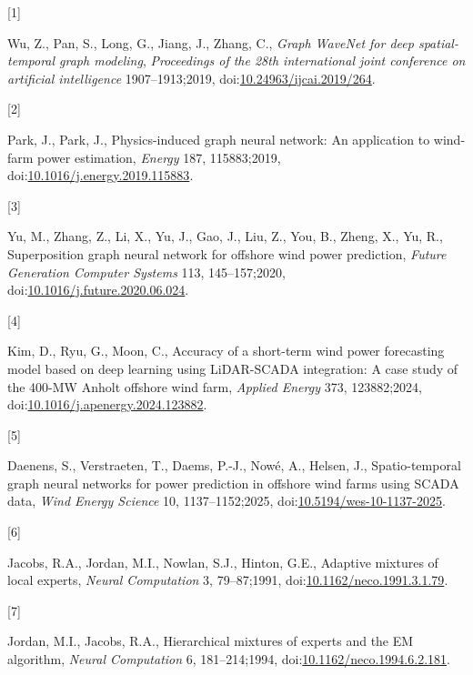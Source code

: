 \documentclass[
  11pt]{article}
\newlength{\cslhangindent}
\newlength{\csllabelwidth}
\newenvironment{CSLReferences}[2] %
 {\begin{list}{}{%
  \setlength{\itemindent}{0pt}
  \setlength{\leftmargin}{0pt}
  \setlength{\parsep}{0pt}
  \ifodd #1
   \setlength{\leftmargin}{\cslhangindent}
   \setlength{\itemindent}{-1\cslhangindent}
  \fi
  \setlength{\itemsep}{#2\baselineskip}}}
 {\end{list}}
\newcommand{\CSLLeftMargin}[1]{\parbox[t]{\csllabelwidth}{\strut#1\strut}}
\newcommand{\CSLRightInline}[1]{\parbox[t]{\linewidth - \csllabelwidth}{\strut#1\strut}}
\begin{document}
\protect{}\label{refs}
\begin{CSLReferences}{0}{0}
\CSLLeftMargin{{[}1{]} }%
\CSLRightInline{Wu, Z., Pan, S., Long, G., Jiang, J., Zhang, C.,
\emph{Graph WaveNet for deep spatial-temporal graph modeling},
\emph{Proceedings of the 28th international joint conference on
artificial intelligence} 1907--1913;2019,
doi:\href{https://doi.org/10.24963/ijcai.2019/264}{10.24963/ijcai.2019/264}.}

\CSLLeftMargin{{[}2{]} }%
\CSLRightInline{Park, J., Park, J., Physics-induced graph neural
network: An application to wind-farm power estimation, \emph{Energy}
187, 115883;2019,
doi:\href{https://doi.org/10.1016/j.energy.2019.115883}{10.1016/j.energy.2019.115883}.}

\CSLLeftMargin{{[}3{]} }%
\CSLRightInline{Yu, M., Zhang, Z., Li, X., Yu, J., Gao, J., Liu, Z.,
You, B., Zheng, X., Yu, R., Superposition graph neural network for
offshore wind power prediction, \emph{Future Generation Computer
Systems} 113, 145--157;2020,
doi:\href{https://doi.org/10.1016/j.future.2020.06.024}{10.1016/j.future.2020.06.024}.}

\CSLLeftMargin{{[}4{]} }%
\CSLRightInline{Kim, D., Ryu, G., Moon, C., Accuracy of a short-term
wind power forecasting model based on deep learning using {LiDAR-SCADA}
integration: A case study of the 400-{MW} {Anholt} offshore wind farm,
\emph{Applied Energy} 373, 123882;2024,
doi:\href{https://doi.org/10.1016/j.apenergy.2024.123882}{10.1016/j.apenergy.2024.123882}.}

\CSLLeftMargin{{[}5{]} }%
\CSLRightInline{Daenens, S., Verstraeten, T., Daems, P.-J., Nowé, A.,
Helsen, J., Spatio-temporal graph neural networks for power prediction
in offshore wind farms using SCADA data, \emph{Wind Energy Science} 10,
1137--1152;2025,
doi:\href{https://doi.org/10.5194/wes-10-1137-2025}{10.5194/wes-10-1137-2025}.}

\CSLLeftMargin{{[}6{]} }%
\CSLRightInline{Jacobs, R.A., Jordan, M.I., Nowlan, S.J., Hinton, G.E.,
Adaptive mixtures of local experts, \emph{Neural Computation} 3,
79--87;1991,
doi:\href{https://doi.org/10.1162/neco.1991.3.1.79}{10.1162/neco.1991.3.1.79}.}

\CSLLeftMargin{{[}7{]} }%
\CSLRightInline{Jordan, M.I., Jacobs, R.A., Hierarchical mixtures of
experts and the {EM} algorithm, \emph{Neural Computation} 6,
181--214;1994,
doi:\href{https://doi.org/10.1162/neco.1994.6.2.181}{10.1162/neco.1994.6.2.181}.}


\end{CSLReferences}
\end{document}
